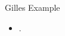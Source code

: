 \begin{frame}{Gilles Example}                                                                                                              
\begin{itemize}
\item .
\end{itemize}
\end{frame}
